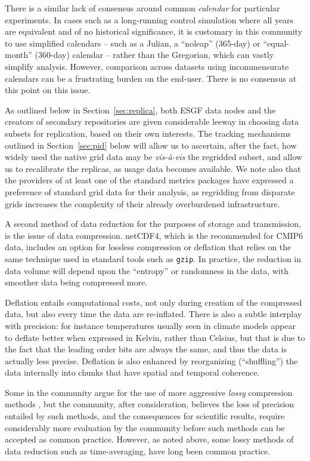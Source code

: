 \documentclass[gmd,manuscript]{copernicus}
\newcommand{\pllabel}[1]{\label{p-#1}\linelabel{l-#1}}
\begin{document}
There is a similar lack of consensus around common \emph{calendar} for
particular experiments.
\pllabel{RC3-13}
In cases such as a long-running control simulation where all years are
equivalent and of no historical significance, it is customary in this
community to use simplified calendars -- such as a Julian, a
``noleap'' (365-day) or ``equal-month'' (360-day) calendar -- rather
than the Gregorian, which can vastly simplify analysis. However,
comparison across datasets using incommensurate calendars can be a
frustrating burden on the end-user. There is no consensus at this
point on this issue.

As outlined below in Section~\ref{sec:replica}, both ESGF data nodes
and the creators of secondary repositories are given considerable
leeway in choosing data subsets for replication, based on their own
interests. The tracking mechanisms outlined in Section~\ref{sec:pid}
below will allow us to ascertain, after the fact, how widely used the
native grid data may be \emph{vis-\`a-vis} the regridded subset, and
allow us to recalibrate the replicas, as usage data becomes available.
We note also that the providers of at least one of the standard
metrics packages \citep[ESMValTool,][]{ref:eyringetal2016a} have
expressed a preference of standard grid data for their analysis, as
regridding from disparate grids increases the complexity of their
already overburdened infrastructure.

A second method of data reduction for the purposes of storage and
transmission, is the issue of data compression. netCDF4, which is the
recommended for CMIP6 data, includes an option for lossless
compression or deflation \citep{ref:zivlempel1977} that relies on the
same technique used in standard tools such as \texttt{gzip}. In
practice, the reduction in data volume will depend upon the
``entropy'' or randomness in the data, with smoother data being
compressed more.

Deflation entails computational costs, not only during creation of the
compressed data, but also every time the data are re-inflated. There
is also a subtle interplay with precision: for instance temperatures
usually seen in climate models appear to deflate better when expressed
in Kelvin, rather than Celsius, but that is due to the fact that the
leading order bits are always the same, and thus the data is actually
less precise. Deflation is also enhanced by reorganizing
(``shuffling'') the data internally into chunks that have spatial and
temporal coherence.

Some in the community argue for the use of more aggressive
\emph{lossy} compression methods \citep{ref:bakeretal2016}, but the
community, after consideration, believes the loss of precision
entailed by such methods, and the consequences for scientific results,
require considerably more evaluation by the community before such
methods can be accepted as common practice. However, as noted above,
some lossy methods of data reduction such as time-averaging, have long
been common practice.
\end{document}
